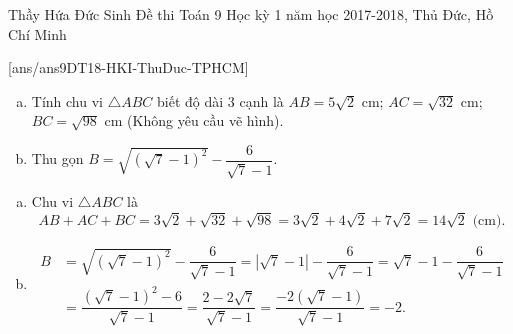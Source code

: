 	\begin{name}
		{Thầy Hứa Đức Sinh}
		{Đề thi Toán 9 Học kỳ 1 năm học 2017-2018, Thủ Đức, Hồ Chí Minh }
	\end{name}
	\setcounter{ex}{0}
	[ans/ans9DT18-HKI-ThuDuc-TPHCM]
	\begin{ex}%
		\begin{enumerate}[a)]
			\item Tính chu vi $\triangle ABC$ biết độ dài 3 cạnh là $AB = 5\sqrt{2}$ cm; $AC = \sqrt{32}$ cm; $BC = \sqrt{98}$ cm (Không yêu cầu vẽ hình).
			\item  Thu gọn $B = \sqrt{(\sqrt{7}-1)^2} - \dfrac{6}{\sqrt{7} - 1}$.
		\end{enumerate}
		\loigiai
		{
			\begin{enumerate}[a)]
				\item Chu vi $\triangle ABC$ là 
				$$AB + AC + BC = 3 \sqrt{2} + \sqrt{32} + \sqrt{98} = 3\sqrt{2} + 4\sqrt{2} + 7\sqrt{2} = 14 \sqrt{2} \text{ (cm).}$$
				\item 
					\begin{align*}
						B &= \sqrt{(\sqrt{7}-1)^2} - \dfrac{6}{\sqrt{7}-1} = \left|\sqrt{7}-1 \right| - \dfrac{6}{\sqrt{7}-1}=\sqrt{7}-1-\dfrac{6}{\sqrt{7}-1} \\
						&= \dfrac{(\sqrt{7}-1)^2 - 6}{\sqrt{7}-1} = \dfrac{2-2\sqrt{7}}{\sqrt{7}-1}=\dfrac{-2(\sqrt{7}-1)}{\sqrt{7}-1} = -2.
					\end{align*}
				 
			\end{enumerate}
		}
	\end{ex}
	
